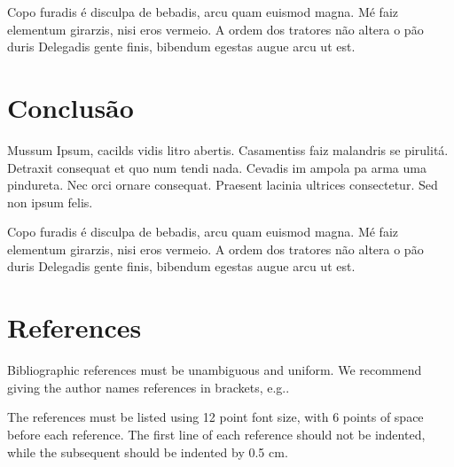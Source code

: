 \documentclass[12pt]{article}
\begin{document}
Copo furadis é disculpa de bebadis, arcu quam euismod magna. Mé faiz elementum girarzis, nisi eros vermeio. A ordem dos tratores não altera o pão duris Delegadis gente finis, bibendum egestas augue arcu ut est.


\section{Conclusão} \label{sec:Conclusao}

Mussum Ipsum, cacilds vidis litro abertis. Casamentiss faiz malandris se pirulitá. Detraxit consequat et quo num tendi nada. Cevadis im ampola pa arma uma pindureta. Nec orci ornare consequat. Praesent lacinia ultrices consectetur. Sed non ipsum felis.

Copo furadis é disculpa de bebadis, arcu quam euismod magna. Mé faiz elementum girarzis, nisi eros vermeio. A ordem dos tratores não altera o pão duris Delegadis gente finis, bibendum egestas augue arcu ut est.



\section{References}

Bibliographic references must be unambiguous and uniform.  We recommend giving
the author names references in brackets, e.g..

The references must be listed using 12 point font size, with 6 points of space
before each reference. The first line of each reference should not be
indented, while the subsequent should be indented by 0.5 cm.



\end{document}
